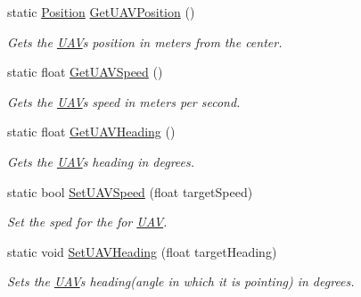 \begin{DoxyCompactItemize}
\mbox{\label{class_n_g_a_p_i_1_1_a_p_i_a889ebb574b908674dacef83a2c3d048f}} 
static \hyperlink{struct_n_g_a_p_i_1_1_position}{Position} \hyperlink{class_n_g_a_p_i_1_1_a_p_i_a889ebb574b908674dacef83a2c3d048f}{Get\+U\+A\+V\+Position} ()
\begin{DoxyCompactList}\small\item\em Gets the \hyperlink{class_n_g_a_p_i_1_1_u_a_v}{U\+AV}\textquotesingle{}s position in meters from the center. \end{DoxyCompactList}\item 
\mbox{\label{class_n_g_a_p_i_1_1_a_p_i_af02ffd997c2941a87a020b74c1852cbf}} 
static float \hyperlink{class_n_g_a_p_i_1_1_a_p_i_af02ffd997c2941a87a020b74c1852cbf}{Get\+U\+A\+V\+Speed} ()
\begin{DoxyCompactList}\small\item\em Gets the \hyperlink{class_n_g_a_p_i_1_1_u_a_v}{U\+AV}\textquotesingle{}s speed in meters per second. \end{DoxyCompactList}\item 
\mbox{\label{class_n_g_a_p_i_1_1_a_p_i_af9bb6767a9d7b036ec43da9b16e10319}} 
static float \hyperlink{class_n_g_a_p_i_1_1_a_p_i_af9bb6767a9d7b036ec43da9b16e10319}{Get\+U\+A\+V\+Heading} ()
\begin{DoxyCompactList}\small\item\em Gets the \hyperlink{class_n_g_a_p_i_1_1_u_a_v}{U\+AV}\textquotesingle{}s heading in degrees. \end{DoxyCompactList}\item 
\mbox{\label{class_n_g_a_p_i_1_1_a_p_i_a362ce9fec87f71fc8b93e8080f83653a}} 
static bool \hyperlink{class_n_g_a_p_i_1_1_a_p_i_a362ce9fec87f71fc8b93e8080f83653a}{Set\+U\+A\+V\+Speed} (float target\+Speed)
\begin{DoxyCompactList}\small\item\em Set the sped for the for \hyperlink{class_n_g_a_p_i_1_1_u_a_v}{U\+AV}. \end{DoxyCompactList}\item 
static void \hyperlink{class_n_g_a_p_i_1_1_a_p_i_a4f4b52858fe2894e7536c1de321fa894}{Set\+U\+A\+V\+Heading} (float target\+Heading)
\begin{DoxyCompactList}\small\item\em Sets the \hyperlink{class_n_g_a_p_i_1_1_u_a_v}{U\+AV}\textquotesingle{}s heading(angle in which it is pointing) in degrees. \end{DoxyCompactList}\item 

\end{DoxyCompactItemize}
